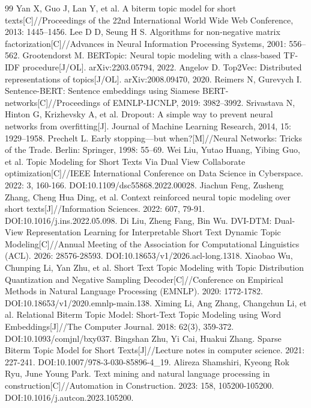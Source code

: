 \documentclass[11pt]{ctexart}
\begin{document}
\begin{thebibliography}{99}
 Yan X, Guo J, Lan Y, et al. A biterm topic model for short texts[C]//Proceedings of the 22nd International World Wide Web Conference, 2013: 1445--1456.
 Lee D D, Seung H S. Algorithms for non-negative matrix factorization[C]//Advances in Neural Information Processing Systems, 2001: 556--562.
 Grootendorst M. BERTopic: Neural topic modeling with a class-based TF-IDF procedure[J/OL]. arXiv:2203.05794, 2022.
 Angelov D. Top2Vec: Distributed representations of topics[J/OL]. arXiv:2008.09470, 2020.
 Reimers N, Gurevych I. Sentence-BERT: Sentence embeddings using Siamese BERT-networks[C]//Proceedings of EMNLP-IJCNLP, 2019: 3982--3992.
 Srivastava N, Hinton G, Krizhevsky A, et al. Dropout: A simple way to prevent neural networks from overfitting[J]. Journal of Machine Learning Research, 2014, 15: 1929--1958.
 Prechelt L. Early stopping---but when?[M]//Neural Networks: Tricks of the Trade. Berlin: Springer, 1998: 55--69.
 Wei Liu, Yutao Huang, Yibing Guo, et al. Topic Modeling for Short Texts Via Dual View Collaborate optimization[C]//IEEE International Conference on Data Science in Cyberspace. 2022: 3, 160-166. DOI:10.1109/dsc55868.2022.00028.
 Jiachun Feng, Zusheng Zhang, Cheng Hua Ding, et al. Context reinforced neural topic modeling over short texts[J]//Information Sciences. 2022: 607, 79-91. DOI:10.1016/j.ins.2022.05.098.
 Di Liu, Zheng Fang, Bin Wu. DVI-DTM: Dual-View Representation Learning for Interpretable Short Text Dynamic Topic Modeling[C]//Annual Meeting of the Association for Computational Linguistics (ACL). 2026: 28576-28593. DOI:10.18653/v1/2026.acl-long.1318.
 Xiaobao Wu, Chunping Li, Yan Zhu, et al. Short Text Topic Modeling with Topic Distribution Quantization and Negative Sampling Decoder[C]//Conference on Empirical Methods in Natural Language Processing (EMNLP). 2020: 1772-1782. DOI:10.18653/v1/2020.emnlp-main.138.
 Ximing Li, Ang Zhang, Changchun Li, et al. Relational Biterm Topic Model: Short-Text Topic Modeling using Word Embeddings[J]//The Computer Journal. 2018: 62(3), 359-372. DOI:10.1093/comjnl/bxy037.
 Bingshan Zhu, Yi Cai, Huakui Zhang. Sparse Biterm Topic Model for Short Texts[J]//Lecture notes in computer science. 2021: 227-241. DOI:10.1007/978-3-030-85896-4\_19.
 Alireza Shamshiri, Kyeong Rok Ryu, June Young Park. Text mining and natural language processing in construction[C]//Automation in Construction. 2023: 158, 105200-105200. DOI:10.1016/j.autcon.2023.105200.

\end{thebibliography}
\end{document}

